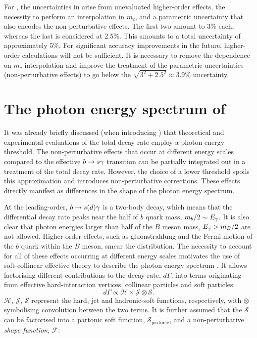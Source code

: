 For \BtoXsgamma, the uncertainties in  arise from unevaluated higher-order effects, the necessity to perform an interpolation in $m_c$, and a parametric uncertainty that also encodes the non-perturbative effects.
The first two amount to $3\%$ each, whereas the last is considered at $2.5\%$. 
This amounts to a total uncertainty of approximately $5\%$.
For significant accuracy improvements in the future, higher-order calculations will not be sufficient.
It is necessary to remove the dependence on $m_c$ interpolation and improve the treatment of the parametric uncertainties (non-perturbative effects) to go below the $\sqrt{3^2+2.5^2}\approx3.9\%$ uncertainty.

\section{The photon energy spectrum of \texorpdfstring{\BtoXsdgamma}{B->Xsg}}\label{sec:btosgamma_spectrum_theory}

It was already briefly discussed (when introducing ) that theoretical and experimental evaluations of the total \BtoXsgamma decay rate employ a photon energy threshold.
The non-perturbative effects that occur at different energy scales compared to the effective $b\rightarrow s\gamma$ transition can be partially integrated out in a treatment of the total decay rate.
However, the choice of a lower threshold spoils this approximation and introduces non-perturbative corrections.
These effects directly manifest as differences in the shape of the photon energy spectrum.

At the leading-order, $b\rightarrow s(d) \gamma$ is a two-body decay, which means that the differential decay rate peaks near the half of $b$ quark mass, $m_b/2\sim E_{\gamma}$.
It is also clear that photon energies larger than half of the $B$ meson mass, $E_{\gamma}>m_B/2$ are not allowed.
Higher-order effects, such as gluonstrahlung and the Fermi motion of the $b$ quark within the $B$ meson, smear the distribution.
The necessity to account for all of these effects occurring at different energy scales motivates the use of soft-collinear effective theory to describe the \BtoXsgamma photon energy spectrum \cite{Neubert:2004qw,Ligeti:2008ac}.
It allows factorising different contributions to the decay rate, $d\Gamma$, into terms originating from effective hard-interaction vertices, collinear particles and soft particles:
\begin{equation}\label{eq:differential_decay_rate_SCET}
    d\Gamma \propto \mathcal{H} \times \mathcal{J} \otimes \mathcal{S}.
\end{equation}
$\mathcal{H}$, $\mathcal{J}$, $\mathcal{S}$ represent the hard, jet and hadronic-soft functions, respectively, with $\otimes$ symbolising convolution between the two terms.
It is further assumed that the $\mathcal{S}$ can be factorised into a partonic soft function, $\mathcal{S}_{\mathrm{partonic}}$, and a non-perturbative \textit{shape function}, $\mathcal{F}$:

